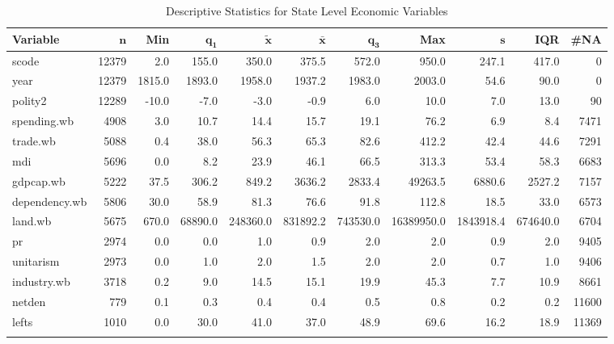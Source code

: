 \begin{landscape}
\begin{longtable}{lrrrrrrrrrr}
\caption{Descriptive Statistics for State Level Economic Variables} \\
	\textbf{Variable} & $\mathbf{n}$ & \textbf{Min} & $\mathbf{q_1}$ & $\mathbf{\widetilde{x}}$ & $\mathbf{\bar{x}}$ & $\mathbf{q_3}$ &
		\textbf{Max} & $\mathbf{s}$ & \textbf{IQR} & \textbf{\#NA} \\ 
			\hline
scode & 12379 &    2.0 &   155.0 &    350.0 &    375.5 &    572.0 &      950.0 &     247.1 &    417.0 &     0 \\ 
  year & 12379 & 1815.0 &  1893.0 &   1958.0 &   1937.2 &   1983.0 &     2003.0 &      54.6 &     90.0 &     0 \\ 
  polity2 & 12289 &  -10.0 &    -7.0 &     -3.0 &     -0.9 &      6.0 &       10.0 &       7.0 &     13.0 &    90 \\ 
  spending.wb &  4908 &    3.0 &    10.7 &     14.4 &     15.7 &     19.1 &       76.2 &       6.9 &      8.4 &  7471 \\ 
  trade.wb &  5088 &    0.4 &    38.0 &     56.3 &     65.3 &     82.6 &      412.2 &      42.4 &     44.6 &  7291 \\ 
  mdi &  5696 &    0.0 &     8.2 &     23.9 &     46.1 &     66.5 &      313.3 &      53.4 &     58.3 &  6683 \\ 
  gdpcap.wb &  5222 &   37.5 &   306.2 &    849.2 &   3636.2 &   2833.4 &    49263.5 &    6880.6 &   2527.2 &  7157 \\ 
  dependency.wb &  5806 &   30.0 &    58.9 &     81.3 &     76.6 &     91.8 &      112.8 &      18.5 &     33.0 &  6573 \\ 
  land.wb &  5675 &  670.0 & 68890.0 & 248360.0 & 831892.2 & 743530.0 & 16389950.0 & 1843918.4 & 674640.0 &  6704 \\ 
  pr &  2974 &    0.0 &     0.0 &      1.0 &      0.9 &      2.0 &        2.0 &       0.9 &      2.0 &  9405 \\ 
  unitarism &  2973 &    0.0 &     1.0 &      2.0 &      1.5 &      2.0 &        2.0 &       0.7 &      1.0 &  9406 \\ 
  industry.wb &  3718 &    0.2 &     9.0 &     14.5 &     15.1 &     19.9 &       45.3 &       7.7 &     10.9 &  8661 \\ 
  netden &   779 &    0.1 &     0.3 &      0.4 &      0.4 &      0.5 &        0.8 &       0.2 &      0.2 & 11600 \\ 
  lefts &  1010 &    0.0 &    30.0 &     41.0 &     37.0 &     48.9 &       69.6 &      16.2 &     18.9 & 11369 \\ 
  \hline
\label{}
\end{longtable}
\end{landscape}